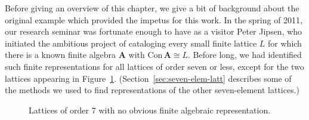 \documentclass[cm,dissertation,actual,final]{uhthesis}
\theoremstyle{plain}
\theoremstyle{definition}
\theoremstyle{remark}
\numberwithin{theorem}{section}
\numberwithin{claim}{chapter}
\numberwithin{equation}{section}
\numberwithin{conjecture}{chapter}
\newcommand{\<}{\ensuremath{\langle}}
\renewcommand{\>}{\ensuremath{\rangle}}
\newcommand{\Con}{\ensuremath{\mathrm{Con\,}}}
\newcommand{\0}{\ensuremath{\mathbf{0}}}
\newcommand{\1}{\ensuremath{\mathbf{1}}}
\newcommand{\2}{\ensuremath{\mathbf{2}}}
\newcommand{\3}{\ensuremath{\mathbf{3}}}
\newcommand{\4}{\ensuremath{\mathbf{4}}}
\newcommand{\5}{\ensuremath{\mathbf{5}}}
\newcommand{\bA}{\ensuremath{\mathbf{A}}}
\begin{document}
Before giving an overview of this chapter, we give a bit of background about the
original example which provided the impetus for this work.  In the spring of
2011, our research seminar was fortunate enough to have 
as a visitor 
%
Peter Jipsen, who initiated the ambitious project of
cataloging every small finite lattice $L$ for which there is a known finite algebra
$\bA$ with $\Con\bA\cong L$.  Before long, we had identified such finite
representations for all lattices of order seven or less, except for the two
lattices appearing in Figure~\ref{fig:sevens}.
(Section~\ref{sec:seven-elem-latt} describes some of the methods we used to find
representations of the other seven-element lattices.)
\begin{figure}[h!]
  \centering
  

  \caption{Lattices of order 7 with no obvious finite algebraic representation.}
  \label{fig:sevens}
\end{figure}
\end{document}
